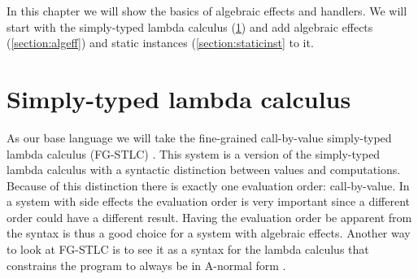 {
\newcommand\change[1]{\colorbox{lightgray}{$#1$}}

\newcommand\eff[0]{\epsilon}
\newcommand\Eff[0]{E}
\newcommand\Op[1]{O^{#1}}

\newcommand\ty[0]{\tau}
\newcommand\tunit[0]{()}
\newcommand\tarr[2]{#1 \rightarrow #2}
\newcommand\thandler[2]{#1 \Rightarrow #2}
\newcommand\tforall[3]{\forall(#1:#2) . #3}
\newcommand\tinst[1]{\mathsf{inst}(#1)}

\newcommand\cty[0]{\underline{\ty}}
\newcommand\aty[2]{#1 \; ! \; #2}
\newcommand\texists[3]{\exists(#1:#2) . #3}
\newcommand\texistss[2]{\exists \overrightarrow{#1} . #2}
\newcommand\val[0]{\nu}
\newcommand\vunit[0]{()}
\newcommand\vinst[0]{\iota}
\newcommand\vabst[3]{\Lambda(#1:#2) . #3}
\newcommand\vabs[2]{\lambda #1 . #2}
\newcommand\vappt[2]{#1 \; [ #2 ]}

\newcommand\comp[0]{c}
\newcommand\creturn[1]{\mathsf{return} \; #1}
\newcommand\capp[2]{#1 \; #2}
\newcommand\cdo[3]{#1 \leftarrow #2 ; #3}
\newcommand\cop[2]{#1(#2)}
\newcommand\copi[3]{#1 \# #2(#3)}
\newcommand\chandle[2]{\mathsf{handle} (#1) \{ #2 \}}
\newcommand\chandlei[3]{\mathsf{handle}^{#1} (#2) \{ #3 \}}
\newcommand\cnew[1]{\mathsf{new} \; #1}
\newcommand\cunpack[4]{(#1, #2) \leftarrow #3 ; #4}

\newcommand\hop[5]{#1 \; #2 \; #3 \rightarrow #4 ; \; #5}
\newcommand\hreturn[2]{\mathsf{return}\; #1 \rightarrow #2}
\newcommand\hopc[4]{#1 \; #2 \; #3 \rightarrow #4}

In this chapter we will show the basics of algebraic effects and handlers. We will start with the simply-typed lambda calculus (\cref{section:stlc}) and add algebraic effects (\cref{section:algeff}) and static instances (\cref{section:staticinst} to it.

\section{Simply-typed lambda calculus} \label{section:stlc}

As our base language we will take the fine-grained call-by-value simply-typed lambda calculus (FG-STLC) \cite{fg-stlc}.
This system is a version of the simply-typed lambda calculus with a syntactic distinction between values and computations.
Because of this distinction there is exactly one evaluation order: call-by-value.
In a system with side effects the evaluation order is very important since a different order could have a different result.
Having the evaluation order be apparent from the syntax is thus a good choice for a system with algebraic effects.
Another way to look at FG-STLC is to see it as a syntax for the lambda calculus that constrains the program to always be in A-normal form \cite{anormalform}.

}
